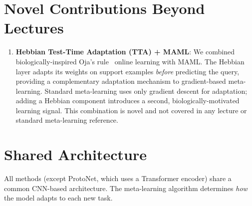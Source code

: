 \documentclass[11pt,a4paper]{article}
\begin{document}
\section{Novel Contributions Beyond Lectures}

\begin{tcolorbox}[colback=orange!3,colframe=novelorange,title=\textbf{What We Did Beyond Course Material}]
\begin{enumerate}[nosep,leftmargin=*]
  \item \textbf{Hebbian Test-Time Adaptation (TTA) + MAML}: We combined biologically-inspired Oja's rule~\cite{oja1982} online learning with MAML. The Hebbian layer adapts its weights on support examples \emph{before} predicting the query, providing a complementary adaptation mechanism to gradient-based meta-learning. Standard meta-learning uses only gradient descent for adaptation; adding a Hebbian component introduces a second, biologically-motivated learning signal. This combination is novel and not covered in any lecture or standard meta-learning reference.
\end{enumerate}
\end{tcolorbox}

\section{Shared Architecture}

All methods (except ProtoNet, which uses a Transformer encoder) share a common CNN-based architecture. The meta-learning algorithm determines \emph{how} the model adapts to each new task.
\end{document}
